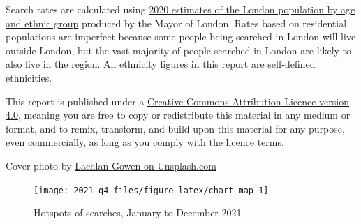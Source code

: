 \documentclass[
  a4paper,
  twoside, 11pt]{article}
\begin{document}
Search rates are calculated using \href{https://data.london.gov.uk/dataset/ethnic-group-population-projections}{2020 estimates of the London population by age and ethnic group} produced by the Mayor of London. Rates based on residential populations are imperfect because some people being searched in London will live outside London, but the vast majority of people searched in London are likely to also live in the region. All ethnicity figures in this report are self-defined ethnicities.

This report is published under a \href{https://creativecommons.org/licenses/by/4.0/}{Creative Commons Attribution Licence version 4.0}, meaning you are free to copy or redistribute this material in any medium or format, and to remix, transform, and build upon this material for any purpose, even commercially, as long as you comply with the licence terms.

Cover photo by \href{https://unsplash.com/photos/RZ5TKFpdaWM}{Lachlan Gowen on Unsplash.com}




\begin{figure}[tb]

{\centering \texttt{[image: 2021\_q4\_files/figure-latex/chart-map-1]} 

}

\caption{Hotspots of searches, January to December 2021}\label{fig:chart-map}
\end{figure}

\restoregeometry
\end{document}
